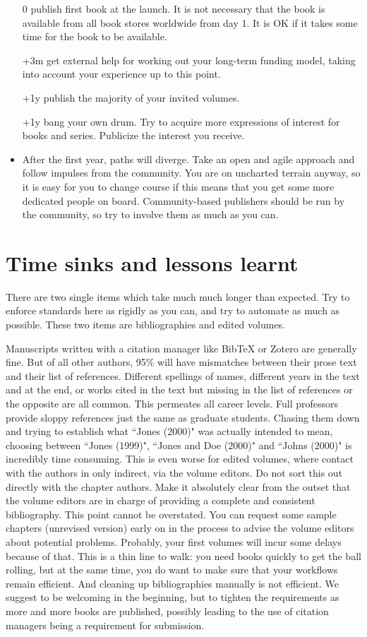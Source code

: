 \documentclass[nonflat,modfonts,output=book] {langsci/langscibook}
\begin{document}
\begin{itemize}
 \item[0] publish first book at the launch. It is not necessary that the book is available from all book stores worldwide from day 1. It is OK if it takes some time for the book to be available. 
 \item[+3m] get external help for working out your long-term funding model, taking into account your experience up to this point. 
 \item[+1y] publish the majority of your invited volumes. 
 \item[+1y] bang your own drum. Try to acquire more expressions of interest for books and series. Publicize the interest you receive. 
 \item After the first year, paths will diverge. Take an open and agile approach and follow impulses from the community. You are on uncharted terrain anyway, so it is easy for you to change course if this means that you get some more dedicated people on board. Community-based publishers should be run by the community, so try to involve them as much as you can.
\end{itemize}


\chapter{Time sinks and lessons learnt}
\largerpage[2]
There are two single items which take much much longer than expected. Try to enforce standards here as rigidly as you can, and try to automate as much as possible. These two items are bibliographies and edited volumes. 

Manuscripts written with a citation manager like BibTeX or Zotero are generally fine. But of all other authors, 95\% will have mismatches between their prose text and their list of references. Different spellings of names, different years in the text and at the end, or works cited in the text but missing in the list of references or the opposite are all common. This permeates all career levels. Full professors provide sloppy references just the same as graduate students. Chasing them down and trying to establish what ``Jones (2000)" was actually intended to mean, choosing between ``Jones (1999)", ``Jones and Doe (2000)" and ``Johns (2000)" is incredibly time consuming. This is even worse for edited volumes, where contact with the authors in only indirect, via the volume editors. Do not sort this out directly with the chapter authors. Make it absolutely clear from the outset that the volume editors are in charge of providing a complete and consistent bibliography. This point cannot be overstated. You can request some sample chapters (unrevised version) early on in the process to advise the volume editors about potential problems. Probably, your first volumes will incur some delays because of that. This is a thin line to walk: you need books quickly to get the ball rolling, but at the same time, you do want to make sure that your workflows remain efficient. And cleaning up bibliographies manually is not efficient. We suggest to be welcoming in the beginning, but to tighten the requirements as more and more books are published, possibly leading to the use of citation managers being a requirement for submission. 
\end{document}
